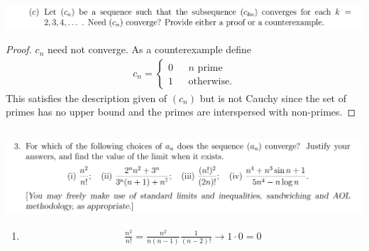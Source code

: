 \documentclass[12pt]{article}
\begin{document}
\begin{mdframed}
\includegraphics[width=400pt]{img/oxford-M2-analysis-I-4-2-c.png}
\end{mdframed}

\begin{proof}
  $c_n$ need not converge. As a counterexample define
  \begin{align*}
    c_n =
    \begin{cases}
      0 ~~~~~~~\text{$n$ prime}\\
      1 ~~~~~~~\text{otherwise}.
    \end{cases}
  \end{align*}
  This satisfies the description given of $(c_n)$ but is not Cauchy since the set of primes has no
  upper bound and the primes are interspersed with non-primes.
\end{proof}

\newpage
\subsection{}
\begin{mdframed}
\includegraphics[width=400pt]{img/oxford-M2-analysis-I-4-3.png}
\end{mdframed}

\begin{enumerate}[label=(\roman*)]
\item
  \begin{align*}
    \frac{n^2}{n!} = \frac{n^2}{n(n-1)}\frac{1}{(n - 2)!} \to 1\cdot 0 = 0
  \end{align*}
\end{enumerate}


\newpage
\end{document}

